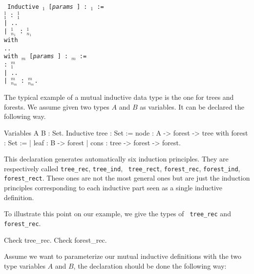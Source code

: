 \medskip
{\tt 
Inductive {{\ident$_1$} [{\rm\sl params} ] : {\type$_1$} :=  \\
\mbox{}\hspace{0.4cm}  {\ident$_1^1$} : {\type$_1^1$} \\
\mbox{}\hspace{0.1cm}| ..  \\
\mbox{}\hspace{0.1cm}| {\ident$_{n_1}^1$} : {\type$_{n_1}^1$}  \\
with\\
\mbox{}\hspace{0.1cm} .. \\
with {\ident$_m$} [{\rm\sl params} ] : {\type$_m$} := \\
\mbox{}\hspace{0.4cm}{\ident$_1^m$} : {\type$_1^m$} \\
\mbox{}\hspace{0.1cm}| .. \\
\mbox{}\hspace{0.1cm}| {\ident$_{n_m}^m$} : {\type$_{n_m}^m$}.
}}
\medskip

\Example
The typical example of a mutual inductive data type is the one for
trees and forests. We assume given two types $A$ and $B$ as variables.
It can be declared the following way.

\begin{coq_example*}
Variables A B : Set.
Inductive tree : Set :=
    node : A -> forest -> tree
with forest : Set :=
  | leaf : B -> forest
  | cons : tree -> forest -> forest.
\end{coq_example*}

This declaration generates automatically six induction
principles. They are respectively 
called {\tt tree\_rec}, {\tt tree\_ind}, {\tt
  tree\_rect}, {\tt forest\_rec}, {\tt forest\_ind}, {\tt
  forest\_rect}.  These ones are not the most general ones but are
just the induction principles corresponding to each inductive part
seen as a single inductive definition.

To illustrate this point on our example, we give the types of {\tt
  tree\_rec} and {\tt forest\_rec}.

\begin{coq_example}
Check tree_rec.
Check forest_rec.
\end{coq_example}

Assume we want to parameterize our mutual inductive definitions with
the two type variables $A$ and $B$, the declaration should be done the
following way:

